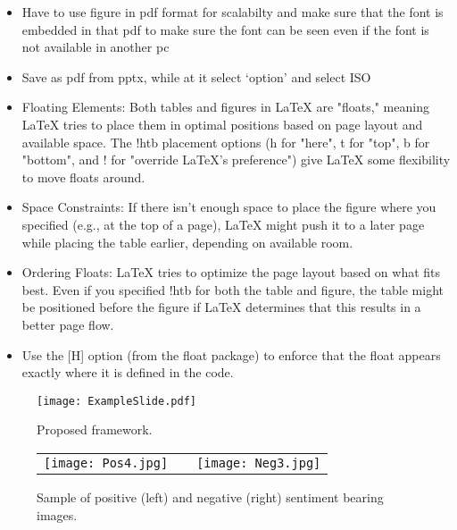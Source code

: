 \documentclass[11pt]{article}
\begin{document}
\begin{itemize}
\item Have to use figure in pdf format for scalabilty and make sure that the font is embedded in that pdf to make sure the font can be seen even if the font is not available in another pc
\item Save as pdf from pptx, while at it select `option' and select ISO
\item Floating Elements: Both tables and figures in LaTeX are "floats," meaning LaTeX tries to place them in optimal positions based on page layout and available space. The !htb placement options (h for "here", t for "top", b for "bottom", and ! for "override LaTeX's preference") give LaTeX some flexibility to move floats around.

\item Space Constraints: If there isn't enough space to place the figure where you specified (e.g., at the top of a page), LaTeX might push it to a later page while placing the table earlier, depending on available room.

\item Ordering Floats: LaTeX tries to optimize the page layout based on what fits best. Even if you specified !htb for both the table and figure, the table might be positioned before the figure if LaTeX determines that this results in a better page flow.
\item Use the [H] option (from the float package) to enforce that the float appears exactly where it is defined in the code.
\end{itemize}


\begin{figure}[!h] %
\centering %
\texttt{[image: ExampleSlide.pdf]}
\caption{Proposed framework.}
\label{fig:overview}
\end{figure}


\begin{figure}[!htb]
\centering
\begin{tabular}{cp{0.5cm}c}
\texttt{[image: Pos4.jpg]}
&
&\texttt{[image: Neg3.jpg]}
\end{tabular}
\caption{Sample of positive (left) and negative (right) sentiment bearing images.}
\label{Fig:sampleImage}
\end{figure}
\end{document}
